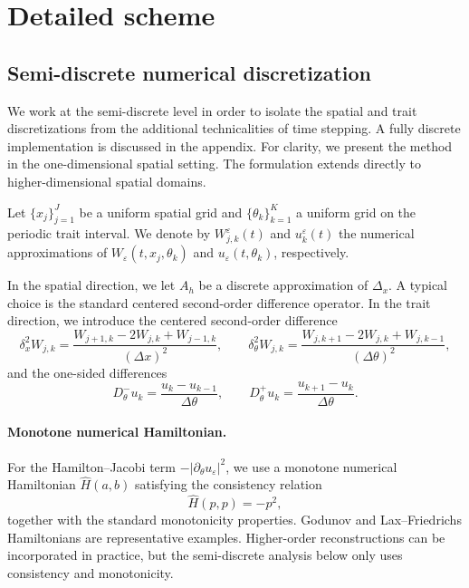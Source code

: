 \documentclass[11pt, dina4, amsfont12]{article}
\begin{document}

\section{Detailed scheme}

\subsection{Semi-discrete numerical discretization}

We work at the semi-discrete level in order to isolate the spatial and trait discretizations from the additional technicalities of time stepping. A fully discrete implementation is discussed in the appendix. For clarity, we present the method in the one-dimensional spatial setting. The formulation extends directly to higher-dimensional spatial domains.

Let \(\{x_j\}_{j=1}^J\) be a uniform spatial grid and \(\{\theta_k\}_{k=1}^K\) a uniform grid on the periodic trait interval. We denote by \(W_{j,k}^{\varepsilon}(t)\) and \(u_k^{\varepsilon}(t)\) the numerical approximations of \(W_\varepsilon(t,x_j,\theta_k)\) and \(u_\varepsilon(t,\theta_k)\), respectively.

In the spatial direction, we let \(A_h\) be a discrete approximation of \(\Delta_x\). A typical choice is the standard centered second-order difference operator. In the trait direction, we introduce the centered second-order difference
\[
\delta_x^2 W_{j,k}
=
\frac{W_{j+1,k}-2W_{j,k}+W_{j-1,k}}{(\Delta x)^2},
\qquad
\delta_\theta^2 W_{j,k}
=
\frac{W_{j,k+1}-2W_{j,k}+W_{j,k-1}}{(\Delta\theta)^2},
\]
and the one-sided differences
\[
D_\theta^- u_k=
\frac{u_k-u_{k-1}}{\Delta\theta},
\qquad
D_\theta^+ u_k=
\frac{u_{k+1}-u_k}{\Delta\theta}.
\]

\paragraph{Monotone numerical Hamiltonian.}
For the Hamilton--Jacobi term \(-|\partial_\theta u_\varepsilon|^2\), we use a monotone numerical Hamiltonian \(\widehat H(a,b)\) satisfying the consistency relation
\[
\widehat H(p,p)=-p^2,
\]
together with the standard monotonicity properties. Godunov and Lax--Friedrichs Hamiltonians are representative examples. Higher-order reconstructions can be incorporated in practice, but the semi-discrete analysis below only uses consistency and monotonicity.
\end{document}
